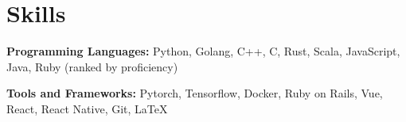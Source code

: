 \documentclass{resume}
\begin{document}

\section{Skills}
\textbf{Programming Languages:} \small Python, Golang, C++, C, Rust, Scala, JavaScript, Java, Ruby (ranked by proficiency)

\textbf{Tools and Frameworks:} \small Pytorch, Tensorflow, Docker, Ruby on Rails, Vue, React, React Native, Git, \LaTeX
\end{document}
